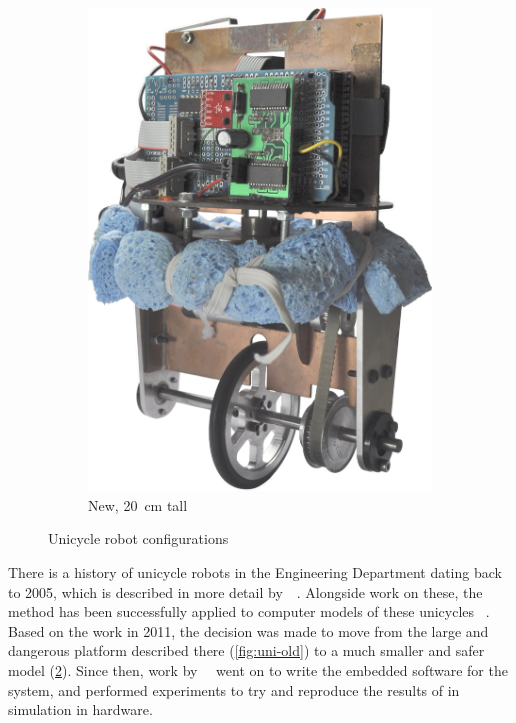 \documentclass[main.tex]{subfiles}
\begin{document}
\begin{figure}[!b]
\begin{subfigure}{0.3\linewidth}
			\includegraphics[width=\linewidth]{figures/front.jpg}
			\caption{New, \SI{20}{\centi\meter} tall}
			\label{fig:uni-new}
		\end{subfigure}
		\hspace*{\fill}
		\caption{Unicycle robot configurations}
	\end{figure}

	There is a history of unicycle robots in the Engineering Department dating back to 2005, which is described in more detail by~\citeauthor{queiro}~\cite{queiro}.
	Alongside work on these, the {\Pilco} method has been successfully applied to computer models of these unicycles ~\cite[section~3.3]{pilco}.
	Based on the work in 2011, the decision was made to move from the large and dangerous platform described there (\cref{fig:uni-old}) to a much smaller and safer model (\cref{fig:uni-new}).
	Since then, work by~\citeauthor{aleksi}~\cite{aleksi} went on to write the embedded software for the system, and performed experiments to try and reproduce the results of {\Pilco} in simulation in hardware.
\end{document}

